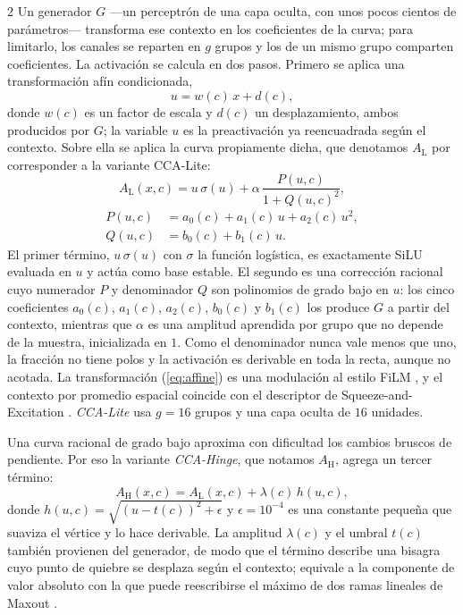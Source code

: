 \begin{multicols}{2}
Un generador $G$ —un perceptrón de una capa oculta, con unos pocos cientos de parámetros— transforma ese contexto en los coeficientes de la curva; para limitarlo, los canales se reparten en $g$ grupos y los de un mismo grupo comparten coeficientes. La activación se calcula en dos pasos. Primero se aplica una transformación afín condicionada,
\begin{equation}
u=w(c)\,x+d(c),
\label{eq:affine}
\end{equation}
donde $w(c)$ es un factor de escala y $d(c)$ un desplazamiento, ambos producidos por $G$; la variable $u$ es la preactivación ya reencuadrada según el contexto. Sobre ella se aplica la curva propiamente dicha, que denotamos $A_{\mathrm{L}}$ por corresponder a la variante CCA-Lite:
\begin{equation}
A_{\mathrm{L}}(x,c)=u\,\sigma(u)+\alpha\,\frac{P(u,c)}{1+Q(u,c)^{2}},
\label{eq:cca}
\end{equation}
\begin{equation}
\begin{split}
P(u,c)&=a_0(c)+a_1(c)\,u+a_2(c)\,u^{2},\\
Q(u,c)&=b_0(c)+b_1(c)\,u .
\end{split}
\label{eq:pq}
\end{equation}
El primer término, $u\,\sigma(u)$ con $\sigma$ la función logística, es exactamente SiLU \cite{silu} evaluada en $u$ y actúa como base estable. El segundo es una corrección racional cuyo numerador $P$ y denominador $Q$ son polinomios de grado bajo en $u$: los cinco coeficientes $a_0(c)$, $a_1(c)$, $a_2(c)$, $b_0(c)$ y $b_1(c)$ los produce $G$ a partir del contexto, mientras que $\alpha$ es una amplitud aprendida por grupo que no depende de la muestra, inicializada en $1$. Como el denominador nunca vale menos que uno, la fracción no tiene polos y la activación es derivable en toda la recta, aunque no acotada. La transformación (\ref{eq:affine}) es una modulación al estilo FiLM \cite{perez2018film}, y el contexto por promedio espacial coincide con el descriptor de Squeeze-and-Excitation \cite{hu2018squeeze}. \textit{CCA-Lite} usa $g=16$ grupos y una capa oculta de $16$ unidades.

Una curva racional de grado bajo aproxima con dificultad los cambios bruscos de pendiente. Por eso la variante \textit{CCA-Hinge}, que notamos $A_{\mathrm{H}}$, agrega un tercer término:
\begin{equation}
A_{\mathrm{H}}(x,c)=A_{\mathrm{L}}(x,c)+\lambda(c)\,h(u,c),
\label{eq:hinge}
\end{equation}
donde $h(u,c)=\sqrt{(u-t(c))^{2}+\epsilon}$ y $\epsilon=10^{-4}$ es una constante pequeña que suaviza el vértice y lo hace derivable. La amplitud $\lambda(c)$ y el umbral $t(c)$ también provienen del generador, de modo que el término describe una bisagra cuyo punto de quiebre se desplaza según el contexto; equivale a la componente de valor absoluto con la que puede reescribirse el máximo de dos ramas lineales de Maxout \cite{goodfellow2013maxout}.


\end{multicols}

